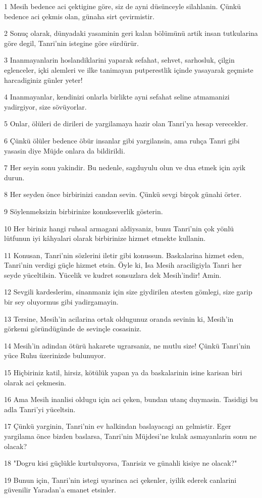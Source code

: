\par 1 Mesih bedence aci çektigine göre, siz de ayni düsünceyle silahlanin. Çünkü bedence aci çekmis olan, günaha sirt çevirmistir.
\par 2 Sonuç olarak, dünyadaki yasaminin geri kalan bölümünü artik insan tutkularina göre degil, Tanri'nin istegine göre sürdürür.
\par 3 Inanmayanlarin hoslandiklarini yaparak sefahat, sehvet, sarhosluk, çilgin eglenceler, içki alemleri ve ilke tanimayan putperestlik içinde yasayarak geçmiste harcadiginiz günler yeter!
\par 4 Inanmayanlar, kendinizi onlarla birlikte ayni sefahat seline atmamanizi yadirgiyor, size sövüyorlar.
\par 5 Onlar, ölüleri de dirileri de yargilamaya hazir olan Tanri'ya hesap verecekler.
\par 6 Çünkü ölüler bedence öbür insanlar gibi yargilansin, ama ruhça Tanri gibi yasasin diye Müjde onlara da bildirildi.
\par 7 Her seyin sonu yakindir. Bu nedenle, sagduyulu olun ve dua etmek için ayik durun.
\par 8 Her seyden önce birbirinizi candan sevin. Çünkü sevgi birçok günahi örter.
\par 9 Söylenmeksizin birbirinize konukseverlik gösterin.
\par 10 Her biriniz hangi ruhsal armagani aldiysaniz, bunu Tanri'nin çok yönlü lütfunun iyi kâhyalari olarak birbirinize hizmet etmekte kullanin.
\par 11 Konusan, Tanri'nin sözlerini iletir gibi konussun. Baskalarina hizmet eden, Tanri'nin verdigi güçle hizmet etsin. Öyle ki, Isa Mesih araciligiyla Tanri her seyde yüceltilsin. Yücelik ve kudret sonsuzlara dek Mesih'indir! Amin.
\par 12 Sevgili kardeslerim, sinanmaniz için size giydirilen atesten gömlegi, size garip bir sey oluyormus gibi yadirgamayin.
\par 13 Tersine, Mesih'in acilarina ortak oldugunuz oranda sevinin ki, Mesih'in görkemi göründügünde de sevinçle cosasiniz.
\par 14 Mesih'in adindan ötürü hakarete ugrarsaniz, ne mutlu size! Çünkü Tanri'nin yüce Ruhu üzerinizde bulunuyor.
\par 15 Hiçbiriniz katil, hirsiz, kötülük yapan ya da baskalarinin isine karisan biri olarak aci çekmesin.
\par 16 Ama Mesih inanlisi oldugu için aci çeken, bundan utanç duymasin. Tasidigi bu adla Tanri'yi yüceltsin.
\par 17 Çünkü yarginin, Tanri'nin ev halkindan baslayacagi an gelmistir. Eger yargilama önce bizden baslarsa, Tanri'nin Müjdesi'ne kulak asmayanlarin sonu ne olacak?
\par 18 "Dogru kisi güçlükle kurtuluyorsa, Tanrisiz ve günahli kisiye ne olacak?"
\par 19 Bunun için, Tanri'nin istegi uyarinca aci çekenler, iyilik ederek canlarini güvenilir Yaradan'a emanet etsinler.

